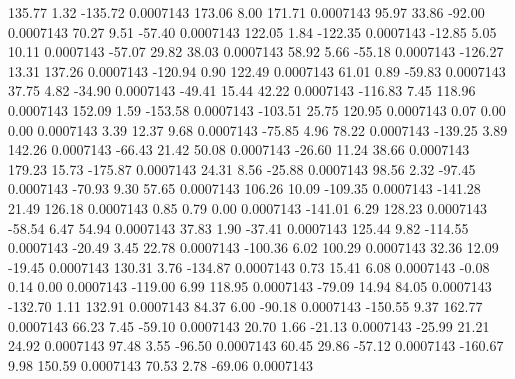       135.77        1.32     -135.72     0.0007143
      173.06        8.00      171.71     0.0007143
       95.97       33.86      -92.00     0.0007143
       70.27        9.51      -57.40     0.0007143
      122.05        1.84     -122.35     0.0007143
      -12.85        5.05       10.11     0.0007143
      -57.07       29.82       38.03     0.0007143
       58.92        5.66      -55.18     0.0007143
     -126.27       13.31      137.26     0.0007143
     -120.94        0.90      122.49     0.0007143
       61.01        0.89      -59.83     0.0007143
       37.75        4.82      -34.90     0.0007143
      -49.41       15.44       42.22     0.0007143
     -116.83        7.45      118.96     0.0007143
      152.09        1.59     -153.58     0.0007143
     -103.51       25.75      120.95     0.0007143
        0.07        0.00        0.00     0.0007143
        3.39       12.37        9.68     0.0007143
      -75.85        4.96       78.22     0.0007143
     -139.25        3.89      142.26     0.0007143
      -66.43       21.42       50.08     0.0007143
      -26.60       11.24       38.66     0.0007143
      179.23       15.73     -175.87     0.0007143
       24.31        8.56      -25.88     0.0007143
       98.56        2.32      -97.45     0.0007143
      -70.93        9.30       57.65     0.0007143
      106.26       10.09     -109.35     0.0007143
     -141.28       21.49      126.18     0.0007143
        0.85        0.79        0.00     0.0007143
     -141.01        6.29      128.23     0.0007143
      -58.54        6.47       54.94     0.0007143
       37.83        1.90      -37.41     0.0007143
      125.44        9.82     -114.55     0.0007143
      -20.49        3.45       22.78     0.0007143
     -100.36        6.02      100.29     0.0007143
       32.36       12.09      -19.45     0.0007143
      130.31        3.76     -134.87     0.0007143
        0.73       15.41        6.08     0.0007143
       -0.08        0.14        0.00     0.0007143
     -119.00        6.99      118.95     0.0007143
      -79.09       14.94       84.05     0.0007143
     -132.70        1.11      132.91     0.0007143
       84.37        6.00      -90.18     0.0007143
     -150.55        9.37      162.77     0.0007143
       66.23        7.45      -59.10     0.0007143
       20.70        1.66      -21.13     0.0007143
      -25.99       21.21       24.92     0.0007143
       97.48        3.55      -96.50     0.0007143
       60.45       29.86      -57.12     0.0007143
     -160.67        9.98      150.59     0.0007143
       70.53        2.78      -69.06     0.0007143
